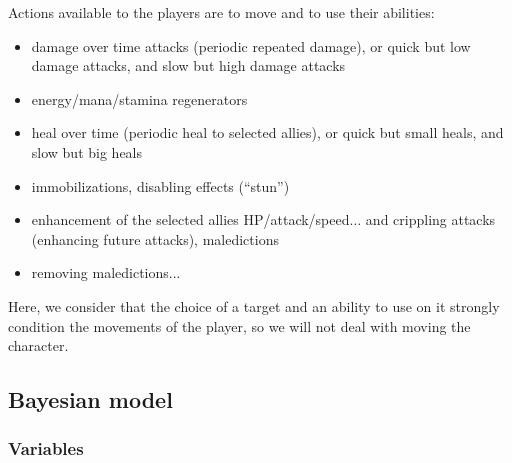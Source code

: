 Actions available to the players are to move and to use their abilities:
\begin{itemize}
    \item damage over time attacks (periodic repeated damage), or quick but low damage attacks, and slow but high damage attacks
    \item energy/mana/stamina regenerators
    \item heal over time (periodic heal to selected allies), or quick but small heals, and slow but big heals
    \item immobilizations, disabling effects (``stun'')
    \item enhancement of the selected allies HP/attack/speed... and crippling attacks (enhancing future attacks), maledictions
    \item removing maledictions...
\end{itemize}

Here, we consider that the choice of a target and an ability to use on it strongly condition the movements of the player, so we will not deal with moving the character.

\subsection{Bayesian model}
\subsubsection{Variables}

